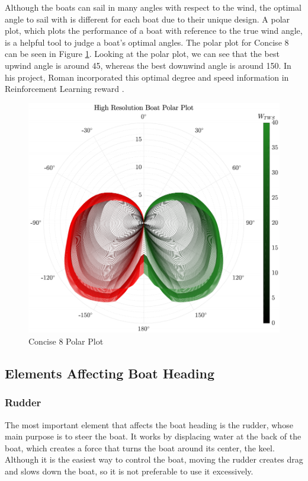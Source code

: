 \documentclass[12pt,twoside]{report}
\begin{document}
Although the boats can sail in many angles with respect to the wind, the optimal angle to sail with is different for each boat due to their unique design. A polar plot, which plots the performance of a boat with reference to the true wind angle, is a helpful tool to judge a boat's optimal angles. The polar plot for Concise 8 can be seen in Figure \ref{fig:polar-plot}. Looking at the polar plot, we can see that the best upwind angle is around 45\degree, whereas the best downwind angle is around 150\degree. In his project, Roman incorporated this optimal degree and speed information in Reinforcement Learning reward \cite{roman}.

\begin{figure}[h]
\centering
\includegraphics[width = 0.85\hsize]{figures/sailing/polar-plot.png}
\caption{Concise 8 Polar Plot \cite{stan}}
\label{fig:polar-plot}
\end{figure}

\subsection{Elements Affecting Boat Heading}
\subsubsection{Rudder}
The most important element that affects the boat heading is the rudder, whose main purpose is to steer the boat. It works by displacing water at the back of the boat, which creates a force that turns the boat around its center, the keel. Although it is the easiest way to control the boat, moving the rudder creates drag and slows down the boat, so it is not preferable to use it excessively.
\end{document}
